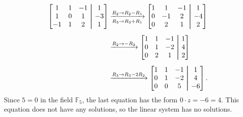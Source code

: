\documentclass[11pt]{exam}
\newcommand\aug{\fboxsep=-\fboxrule\!\!\!\fbox{\strut}\!\!\!}
\begin{document}
\begin{align*}
\begin{bmatrix}
1 & 1 & -1 &\aug& 1\\
1 & 0 & 1 &\aug& -3\\
-1 & 1 & 2 &\aug& 1
\end{bmatrix}
&\xrightarrow[R_3\to R_3+R_1]{R_2\to R_2-R_1}
\begin{bmatrix}
1 & 1 & -1 &\aug& 1\\
0 & -1 & 2 & \aug& -4\\
0 & 2 & 1 &\aug& 2
\end{bmatrix}\\[5pt]
&\xrightarrow{R_2\to -R_2}
\begin{bmatrix}
1 & 1 & -1 &\aug& 1\\
0 & 1 & -2 &\aug& 4\\
0 & 2 & 1 &\aug& 2
\end{bmatrix}\\[5pt]
&\xrightarrow{R_3\to R_3-2R_2}
\begin{bmatrix}
1 & 1 & -1 &\aug& 1\\
0 & 1 & -2 &\aug& 4\\
0 & 0 & 5 &\aug& -6
\end{bmatrix}.
\end{align*}
Since $5=0$ in the field $\mathbb{F}_5$, the last equation has the form $0\cdot z = -6=4$. This equation does not have any solutions, so the linear system has no solutions.
\fi
\newpage
\end{document}
